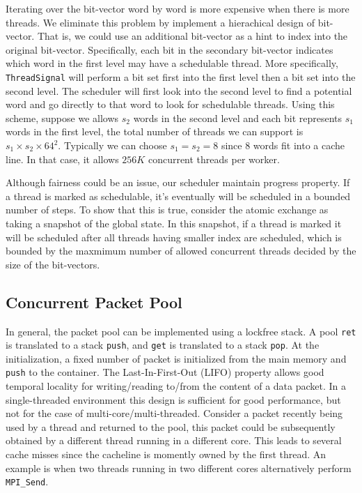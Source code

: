 Iterating over the bit-vector word by word is more expensive when
there is more threads. We eliminate this problem by implement a hierachical design of
bit-vector.  That is, we could use an additional bit-vector as a hint to index
into the original bit-vector. Specifically, each bit in the secondary
bit-vector indicates which word in the first level may have a schedulable
thread. More specifically, \texttt{ThreadSignal} will perform a bit set first
into the first level then a bit set into the second level. The scheduler will
first look into the second level to find a potential word and go directly to
that word to look for schedulable threads. %
Using this scheme, suppose we allows $s_2$ words in the second level and each
bit represents $s_1$ words in the first level, the total number of threads we
can support is $s_1 \times s_2 \times 64^2$. Typically we can choose $s_1 = s_2
= 8$ since 8 words fit into a cache line. In that case, it allows $256K$
concurrent threads per worker. 

Although fairness could be an issue, our scheduler maintain progress property.
If a thread is marked as schedulable, it's eventually will be scheduled in a
bounded number of steps. To show that this is true, consider the atomic
exchange as taking a snapshot of the global state. In this snapshot, if a
thread is marked it will be scheduled after all threads having smaller index
are scheduled, which is bounded by the maxmimum number of allowed concurrent
threads decided by the size of the bit-vectors.

\subsection{Concurrent Packet Pool}
In general, the packet pool can be implemented using a lockfree stack. A pool
\texttt{ret} is translated to a stack \texttt{push}, and \texttt{get} is
translated to a stack \texttt{pop}. At the initialization, a fixed number of
packet is initialized from the main memory and \texttt{push} to the container.
The Last-In-First-Out (LIFO) property allows good temporal locality for
writing/reading to/from the content of a data packet. In a single-threaded
environment this design is sufficient for good performance, but not for the
case of multi-core/multi-threaded. Consider a packet recently being used by a thread
and returned to the pool, this packet could be subsequently obtained by a different thread
running in a different core. This leads to several cache misses since the cacheline
is momently owned by the first thread. An example is when two threads running in 
two different cores alternatively perform \texttt{MPI_Send}.

